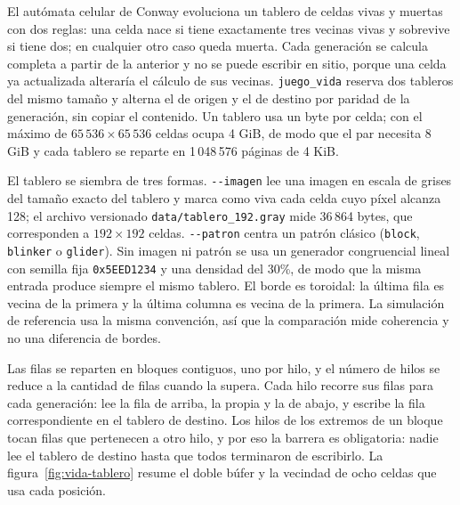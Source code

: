 El autómata celular de Conway evoluciona un tablero de celdas vivas y muertas con dos reglas: una celda nace si tiene exactamente tres vecinas vivas y sobrevive si tiene dos; en cualquier otro caso queda muerta. Cada generación se calcula completa a partir de la anterior y no se puede escribir en sitio, porque una celda ya actualizada alteraría el cálculo de sus vecinas. \texttt{juego\_vida} reserva dos tableros del mismo tamaño y alterna el de origen y el de destino por paridad de la generación, sin copiar el contenido. Un tablero usa un byte por celda; con el máximo de $65\,536 \times 65\,536$ celdas ocupa 4 GiB, de modo que el par necesita 8 GiB y cada tablero se reparte en 1\,048\,576 páginas de 4 KiB.

El tablero se siembra de tres formas. \texttt{-{}-imagen} lee una imagen en escala de grises del tamaño exacto del tablero y marca como viva cada celda cuyo píxel alcanza 128; el archivo versionado \texttt{data/tablero\_192.gray} mide 36\,864 bytes, que corresponden a $192 \times 192$ celdas. \texttt{-{}-patron} centra un patrón clásico (\texttt{block}, \texttt{blinker} o \texttt{glider}). Sin imagen ni patrón se usa un generador congruencial lineal con semilla fija \texttt{0x5EED1234} y una densidad del 30\%, de modo que la misma entrada produce siempre el mismo tablero. El borde es toroidal: la última fila es vecina de la primera y la última columna es vecina de la primera. La simulación de referencia usa la misma convención, así que la comparación mide coherencia y no una diferencia de bordes.

Las filas se reparten en bloques contiguos, uno por hilo, y el número de hilos se reduce a la cantidad de filas cuando la supera. Cada hilo recorre sus filas para cada generación: lee la fila de arriba, la propia y la de abajo, y escribe la fila correspondiente en el tablero de destino. Los hilos de los extremos de un bloque tocan filas que pertenecen a otro hilo, y por eso la barrera es obligatoria: nadie lee el tablero de destino hasta que todos terminaron de escribirlo. La figura~\ref{fig:vida-tablero} resume el doble búfer y la vecindad de ocho celdas que usa cada posición.

